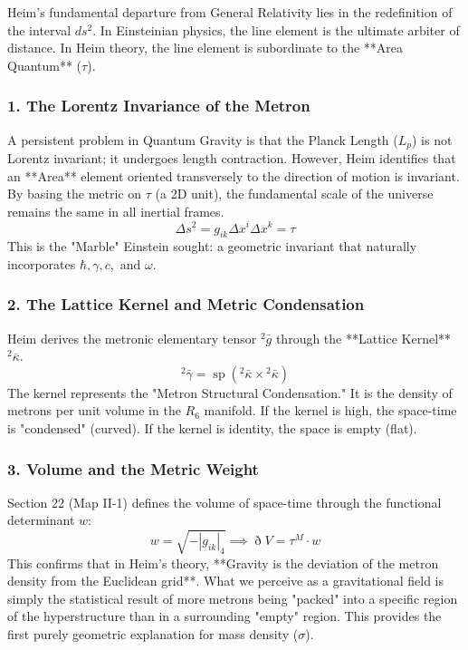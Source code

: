 \documentclass[11pt,a4paper,oneside]{article}
\DeclareMathOperator{\spn}{sp}
\newcommand{\ethop}{\eth}
\begin{document}
Heim’s fundamental departure from General Relativity lies in the redefinition of the interval $ds^2$. In Einsteinian physics, the line element is the ultimate arbiter of distance. In Heim theory, the line element is subordinate to the **Area Quantum** ($\tau$).

\subsubsection*{1. The Lorentz Invariance of the Metron}
A persistent problem in Quantum Gravity is that the Planck Length ($L_p$) is not Lorentz invariant; it undergoes length contraction. However, Heim identifies that an **Area** element oriented transversely to the direction of motion is invariant. By basing the metric on $\tau$ (a 2D unit), the fundamental scale of the universe remains the same in all inertial frames.
\begin{equation}
    \Delta s^2 = g_{ik} \Delta x^i \Delta x^k = \tau
\tag{Quantized Interval}
\end{equation}
This is the "Marble" Einstein sought: a geometric invariant that naturally incorporates $\hbar, \gamma, c,$ and $\omega$.

\subsubsection*{2. The Lattice Kernel and Metric Condensation}
Heim derives the metronic elementary tensor ${}^2 \bar{g}$ through the **Lattice Kernel** ${}^2 \bar{\kappa}$.
\begin{equation}
    {}^2 \bar{\gamma} = \spn({}^2 \bar{\kappa} \times {}^{2} \bar{\kappa})
\end{equation}
The kernel represents the "Metron Structural Condensation." It is the density of metrons per unit volume in the $R_6$ manifold. If the kernel is high, the space-time is "condensed" (curved). If the kernel is identity, the space is empty (flat). 

\subsubsection*{3. Volume and the Metric Weight}
Section 22 (Map II-1) defines the volume of space-time through the functional determinant $w$:
\begin{equation}
    w = \sqrt{-|g_{ik}|_4} \implies \ethop V = \tau^M \cdot w
\end{equation}
This confirms that in Heim's theory, **Gravity is the deviation of the metron density from the Euclidean grid**. What we perceive as a gravitational field is simply the statistical result of more metrons being "packed" into a specific region of the hyperstructure than in a surrounding "empty" region. This provides the first purely geometric explanation for mass density ($\sigma$). 
\end{document}
